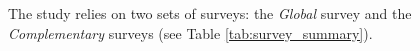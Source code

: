 
The study relies on two sets of surveys: the \textit{Global} survey and the \textit{Complementary} surveys (see Table \ref{tab:survey_summary}).


